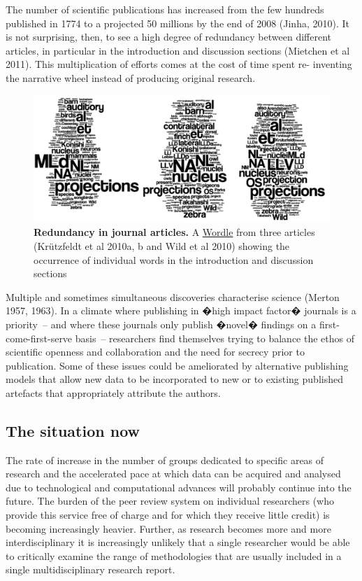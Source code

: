 \documentclass[final,authoryear,3p]{elsarticle-open-drafting}
\begin{document}
The number of scientific publications has increased from the few hundreds published in 1774 to a projected 50 millions by the 
end of 2008 (Jinha, 2010). It is not surprising, then, to see a high degree of redundancy between different articles, in particular in 
the introduction and discussion sections (Mietchen et al 2011). This multiplication of efforts comes at the cost of time spent re-
inventing the narrative wheel instead of producing original research.


\begin{figure}[!ht]
	\begin{center}
		\includegraphics[width=13cm]{Images/Papers-wordle.png}
		\caption{
		{\bf Redundancy in journal articles.} A \href{http://www.wordle.net}{Wordle} from three articles (Kr{\"u}tzfeldt et al 2010a, b and Wild et al 2010) showing the occurrence of individual words in the introduction and discussion sections
		}
		\label{Figure:Wordle}
	\end{center}
\end{figure}


Multiple and sometimes simultaneous discoveries characterise science (Merton 1957, 1963). In a climate where publishing in �high impact factor� journals is a priority~-- and where these journals only publish �novel� findings on a first-come-first-serve 
basis~-- researchers find themselves trying to balance the ethos of scientific openness and collaboration and the need for 
secrecy prior to publication. Some of these issues could be ameliorated by alternative publishing models that allow new data to 
be incorporated to new or to existing published artefacts that appropriately attribute the authors.

\subsection{The situation now}

The rate of increase in the number of groups dedicated to specific areas of research and the accelerated pace at which data can 
be acquired and analysed due to technological and computational advances will probably continue into the future. The burden of 
the peer review system on individual researchers (who provide this service free of charge and for which they receive little credit) 
is becoming increasingly heavier. Further, as research becomes more and more interdisciplinary it is increasingly unlikely that a 
single researcher would be able to critically examine the range of methodologies that are usually included in a single 
multidisciplinary research report.
\end{document}
